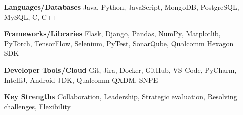 \documentclass[letterpaper,10pt]{article}
\begin{document}
\begin{itemize}[itemsep=-2pt, parsep=2pt, leftmargin=130pt, labelwidth=120pt, align=parleft]
    \item[\textbf{Languages/Databases}]
    Java, Python, JavaScript, MongoDB, PostgreSQL, MySQL, C, C++

    \item[\textbf{Frameworks/Libraries}]
    Flask, Django, Pandas, NumPy, Matplotlib, PyTorch, TensorFlow, Selenium, 
    PyTest, SonarQube, Qualcomm Hexagon SDK

    \item[\textbf{Developer Tools/Cloud}]
    Git, Jira, Docker, GitHub, VS Code, PyCharm, IntelliJ, Android JDK, Qualcomm QXDM, SNPE

    \item[\textbf{Key Strengths}]
    Collaboration, Leadership, Strategic evaluation, Resolving challenges, Flexibility
\end{itemize}



  
\end{document}
